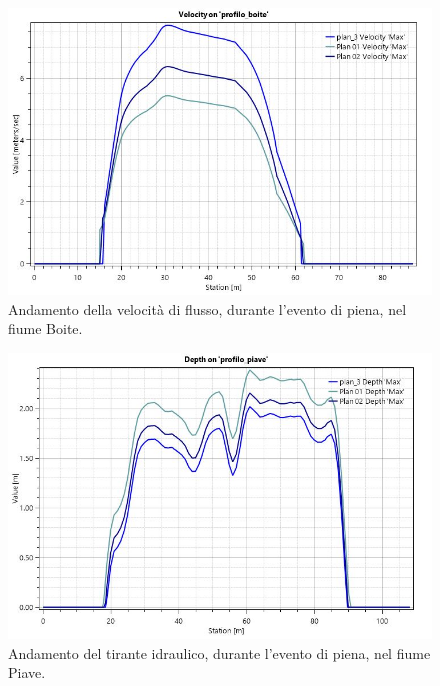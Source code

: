 \begin{figure}[H] \centering
    \includegraphics[scale=0.5]{immagini/velocity_boite.JPG}
    \caption{Andamento della velocità di flusso, durante l'evento di piena, nel fiume Boite.}
    \label{figure:velocity_boite}
\end{figure}

\begin{figure}[H] \centering
    \includegraphics[scale=0.5]{immagini/depth_piave.JPG}
    \caption{Andamento del tirante idraulico, durante l'evento di piena, nel fiume Piave.}
    \label{figure:depth_piave}
\end{figure}

